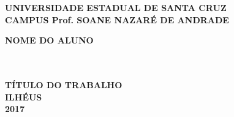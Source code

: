 \thispagestyle{empty}

\vfill
 \begin{center}
    

    {\large\bfseries UNIVERSIDADE ESTADUAL DE SANTA CRUZ} \\
    
   
    {\large\bfseries CAMPUS Prof. SOANE NAZARÉ DE ANDRADE}  \\ 

    \vspace*{1in}
    \begin{large} \bfseries NOME DO ALUNO \end{large}\\[0.4in]

    \vspace*{4cm}
    \noindent \\
    
    \large\bfseries{TÍTULO DO TRABALHO} \\
    \vfill
    \large\bfseries{ ILHÉUS \\ 2017}
\end{center}

\normalsize


